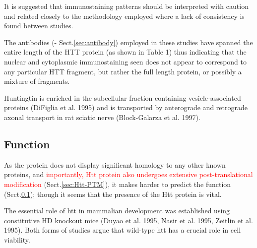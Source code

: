It is suggested that immunostaining patterns should be interpreted with caution
and related closely to the methodology employed where a lack of consistency is
found between studies.

The antibodies (- Sect.\ref{sec:antibody}) employed in these studies have
spanned the entire length of the HTT protein (as shown in Table 1) thus
indicating that the nuclear and cytoplasmic immunostaining seen does not appear
to correspond to any particular HTT fragment, but rather the full length
protein, or possibly a mixture of fragments.


Huntingtin is enriched in the subcellular fraction containing vesicle-associated
proteins (DiFiglia et al. 1995) and is transported by anterograde and retrograde
axonal transport in rat sciatic nerve (Block-Galarza et al. 1997).



\subsection{Function}
\label{sec:Htt-protein-function}

As the protein does not display significant homology to any other known
proteins, and \textcolor{red}{importantly, Htt protein also undergoes extensive
post-translational modification} (Sect.\ref{sec:Htt-PTM}), it makes harder to
predict the function (Sect.\ref{sec:Htt-protein-function}); though it seems
that the presence of the Htt protein is vital.

The essential role of htt in mammalian development was established using
constitutive HD knockout mice (Duyao et al. 1995, Nasir et al. 1995, Zeitlin et
al. 1995). Both forms of studies argue that wild-type htt has a crucial role in
cell viability.

